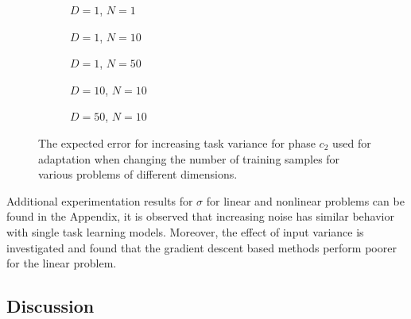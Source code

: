 \begin{figure}[!h]
  \centering
    \begin{subfigure}{0.32\textwidth}
      \centering
      \caption{$D=1$, $N=1$}
      \label{fig:nonlinear-c2-N-1-D-1}
    \end{subfigure}
    \begin{subfigure}{0.32\textwidth}
      \centering
      \caption{$D=1$, $N=10$}
      \label{fig:nonlinear-c2-N-10-D-1}
    \end{subfigure}
    \begin{subfigure}{0.32\textwidth}
      \centering
      \caption{$D=1$, $N=50$}
      \label{fig:nonlinear-c2-N-50-D-1}
    \end{subfigure}

    \begin{subfigure}{0.32\textwidth}
      \centering
      \caption{$D=10$, $N=10$}
      \label{fig:nonlinear-c2-N-10-D-10}
    \end{subfigure}
    \begin{subfigure}{0.32\textwidth}
      \centering
      \caption{$D=50$, $N=10$}
      \label{fig:nonlinear-c2-N-10-D-50}
    \end{subfigure}  


  \caption{The expected error for increasing task variance for phase $c_2$ used for adaptation when changing the number of training samples for various problems of different dimensions.}
  \label{fig:nonlinear-c2}
\end{figure}

Additional experimentation results for $\sigma$ for linear and nonlinear problems can be found in the Appendix, it is observed that increasing noise has similar behavior with single task learning models. Moreover, the effect of input variance is investigated and found that the gradient descent based methods perform poorer for the linear problem. 


\subsection{Discussion}

